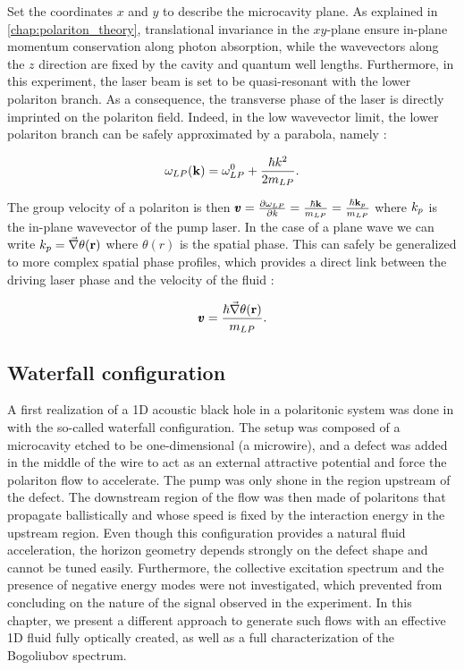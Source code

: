 Set the coordinates $x$ and $y$ to describe the microcavity plane. As explained in \autoref{chap:polariton_theory}, translational invariance in the $xy$-plane ensure in-plane momentum conservation along photon absorption, while the wavevectors along the
$z$ direction are fixed by the cavity and quantum well lengths. Furthermore, in this experiment, the laser beam is set to be quasi-resonant with the lower polariton branch. As a consequence, the transverse phase of the laser is directly imprinted on the polariton field.
Indeed, in the low wavevector limit, the lower polariton branch can be safely approximated by a parabola, namely :

\begin{equation}
    \omega_{LP}(\mathbf{k}) = \omega_{LP}^0 + \dfrac{\hbar k^2}{2m_{LP}}.
\end{equation}

The group velocity of a polariton is then $\pmb{v} = \frac{\partial \omega_{LP}}{\partial k} = \frac{\hbar \mathbf{k}}{m_{LP}}= \frac{\hbar \mathbf{k}_p}{m_{LP}}$ where $k_p$ is the in-plane wavevector of the pump laser.
In the case of a plane wave we can write $k_p=\vec{\nabla}\theta(\mathbf{r})$ where $\theta(r)$ is the spatial phase. This can safely be generalized to more complex spatial phase profiles,
which provides a direct link between the driving laser phase and the velocity of the fluid :

\begin{equation}
    \pmb{v} = \dfrac{\hbar \vec{\nabla} \theta(\mathbf{r})}{m_{LP}} .
\end{equation}

\subsection{Waterfall configuration}
A first realization of a 1D acoustic black hole in a polaritonic system was done in \cite{nguyen_acoustic_2015} with the so-called waterfall configuration. 
The setup was composed of a microcavity etched to be one-dimensional (a microwire), and a defect was added in the middle of the wire to act as an external attractive potential and force the polariton flow to accelerate. The pump was only shone in the region upstream of the defect. The downstream region of the flow was then made of polaritons that propagate ballistically and whose speed is fixed by the interaction energy
in the upstream region.
Even though this configuration provides a natural fluid acceleration, the horizon geometry depends strongly on the defect shape and cannot be tuned easily.  Furthermore, the collective excitation spectrum and the presence of negative energy modes were not investigated, which 
prevented from concluding on the nature of the signal observed in the experiment. In this chapter, we present a different approach to generate such flows with an effective 1D fluid fully optically created, as well as a full characterization of the Bogoliubov spectrum.

